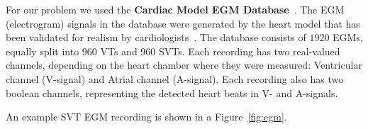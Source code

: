 For our problem we used the  
\textbf{Cardiac Model EGM Database}~\cite{jiang2016silico}. 
The EGM (electrogram) signals in the database were generated 
by the heart
model that has been validated for realism by 
cardiologists~\cite{jiang2016silico}.
	The database consists
	of $1920$ EGMs, equally split into $960$ VTs 
	and
	$960$ SVTs. Each recording has two real-valued channels, 
	depending on the 
	heart chamber where they were measured: Ventricular channel 
	(V-signal) and Atrial channel (A-signal). Each recording also has 
	two boolean channels, representing the detected heart beats in V- 
	and A-signals.
	
	An example SVT EGM recording is shown in a Figure~\ref{fig:egm}. 

